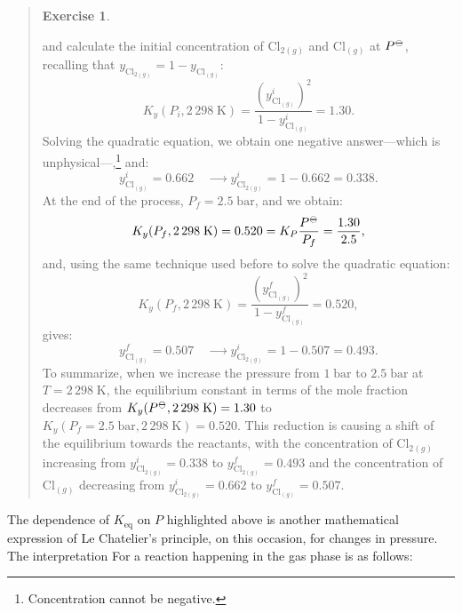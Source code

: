 \documentclass[
  9pt,
]{extbook}
\theoremstyle{definition}
\theoremstyle{definition}
\theoremstyle{definition}
\newtheorem{exercise}{Exercise}[chapter]
\theoremstyle{remark}
\begin{document}
\begin{quote}
\begin{exercise}
\begin{itemize}
  and calculate the initial concentration of \(\mathrm{Cl}_{2(g)}\) and \(\mathrm{Cl}_{(g)}\) at \(P^{-\kern-6pt{\ominus}\kern-6pt-}\), recalling that \(y_{\mathrm{Cl}_{2(g)}}=1-y_{\mathrm{Cl}_{(g)}}:\)
  \begin{equation}
  K_y (P_i,2\,298\;\text{K})=\frac{\left(y^i_{\mathrm{Cl}_{(g)}}\right)^2}{1-y^i_{\mathrm{Cl}_{(g)}}} = 1.30.
  \end{equation}
  Solving the quadratic equation, we obtain one negative answer---which is unphysical---,\footnote{Concentration cannot be negative.} and:
  \begin{equation}
  y_{\mathrm{Cl}_{(g)}}^i= 0.662 \quad \xrightarrow \qquad y_{\mathrm{Cl}_{2(g)}}^i=1-0.662 = 0.338.
  \end{equation}
  At the end of the process, \(P_f=2.5\;\text{bar}\), and we obtain:
  \begin{equation}
  K_y (P_f,2\,298\;\text{K}) = 0.520 = K_P \frac{P^{-\kern-6pt{\ominus}\kern-6pt-}}{P_f} = \frac{1.30}{2.5},
  \end{equation}
  and, using the same technique used before to solve the quadratic equation:
  \begin{equation}
  K_y (P_f,2\,298\;\text{K})=\frac{\left(y^f_{\mathrm{Cl}_{(g)}}\right)^2}{1-y^f_{\mathrm{Cl}_{(g)}}} = 0.520,
  \end{equation}
  gives:
  \begin{equation}
  y_{\mathrm{Cl}_{(g)}}^f=0.507 \quad \xrightarrow \qquad y_{\mathrm{Cl}_{2(g)}}^i=1-0.507 = 0.493.
  \end{equation}
  To summarize, when we increase the pressure from \(1\;\text{bar}\) to \(2.5\;\text{bar}\) at \(T=2\,298\;\text{K}\), the equilibrium constant in terms of the mole fraction decreases from \(K_y(P^{-\kern-6pt{\ominus}\kern-6pt-},2\,298\;\text{K})=1.30\) to \(K_y(P_f=2.5\;\text{bar},2\,298\;\text{K})=0.520\). This reduction is causing a shift of the equilibrium towards the reactants, with the concentration of \(\text{Cl}_{2(g)}\) increasing from \(y_{\text{Cl}_{2(g)}}^i = 0.338\) to \(y_{\text{Cl}_{2(g)}}^f = 0.493\) and the concentration of \(\text{Cl}_{(g)}\) decreasing from \(y_{\text{Cl}_{2(g)}}^i = 0.662\) to \(y_{\text{Cl}_{(g)}}^f = 0.507\).
\end{itemize}
\end{exercise}
\end{quote}

The dependence of \(K_{\text{eq}}\) on \(P\) highlighted above is another mathematical expression of Le Chatelier's principle, on this occasion, for changes in pressure. The interpretation For a reaction happening in the gas phase is as follows:
\end{document}
